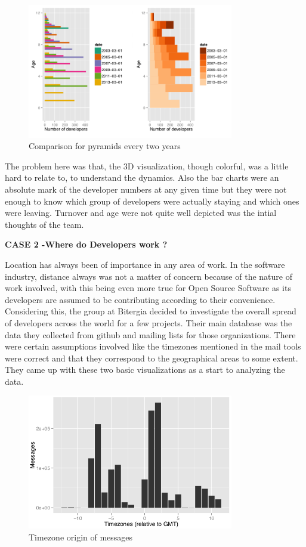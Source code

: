 \documentclass[seploa]{beavtex}
\begin{document}
\begin{figure}[!ht]
\centering
\includegraphics[width=90mm]{age1.png}
\caption{Comparison for pyramids every two years}
\end{figure}

The problem here was that, the 3D visualization, though colorful, was a little hard to relate to, to understand the dynamics. Also the bar charts were an absolute mark of the developer numbers at any given time but they were not enough to know which group of developers were actually staying and which ones were leaving. Turnover and age were not quite well depicted was the intial thoughts of the team.

 \textbf{CASE 2 -Where do Developers work ?}

Location has always been of importance in any area of work. In the software industry, distance always was not a matter of concern because of the nature of work involved, with this being even more true for Open Source Software as its developers are assumed to be contributing according to their convenience\cite{yuri2010}. Considering this, the group at Bitergia decided to investigate the overall spread of developers across the world for a few projects. Their main database was the data they collected from github and mailing lists for those organizations. There were certain assumptions involved like the timezones mentioned in the mail tools were correct and that they correspond to the geographical areas to some extent. They came up with these two basic visualizations as a start to analyzing the data.

\begin{figure}[!ht]
\centering
\includegraphics[width=90mm]{work1.png}
\caption{Timezone origin of messages}
\end{figure}
\end{document}
